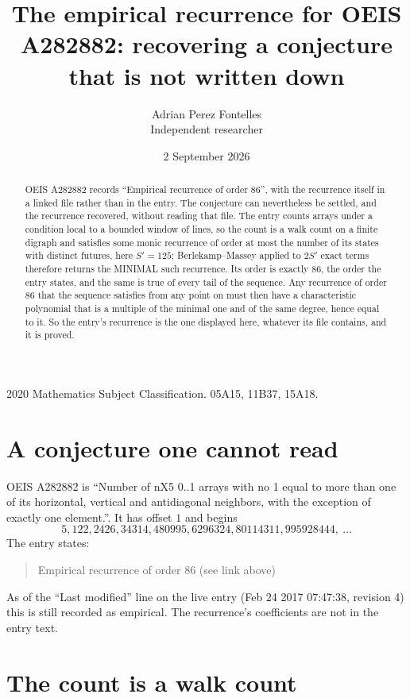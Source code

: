 \documentclass[11pt,a4paper]{article}
\title{The empirical recurrence for OEIS A282882: recovering a conjecture that is not written down}
\author{Adrian Perez Fontelles\\ \small Independent researcher}
\date{2 September 2026}
\theoremstyle{plain}
\theoremstyle{definition}
\begin{document}
\maketitle

\begin{abstract}
OEIS A282882 records ``Empirical recurrence of order $86$'', with the recurrence itself in a
linked file rather than in the entry. The conjecture can nevertheless be settled, and the
recurrence recovered, without reading that file. The entry counts arrays under a condition
local to a bounded window of lines, so the count is a walk count on a finite digraph and
satisfies some monic recurrence of order at most the number of its states with distinct
futures, here $S'=125$; Berlekamp--Massey applied to $2S'$ exact
terms therefore returns the MINIMAL such recurrence. Its order is exactly $86$, the order
the entry states, and the same is true of every tail of the sequence. Any recurrence of order
$86$ that the sequence satisfies from any point on must then have a characteristic
polynomial that is a multiple of the minimal one and of the same degree, hence equal to it. So
the entry's recurrence is the one displayed here, whatever its file contains, and it is
proved.
\end{abstract}

\noindent\small 2020 Mathematics Subject Classification. 05A15, 11B37, 15A18.\normalsize

\section{A conjecture one cannot read}

OEIS A282882 is ``Number of nX5 0..1 arrays with no 1 equal to more than one of its horizontal, vertical and antidiagonal neighbors, with the exception of exactly one element.''. It has offset $1$ and begins
\[
5, 122, 2426, 34314, 480995, 6296324, 80114311, 995928444,\ \dots
\]
The entry states:
\begin{quote}
Empirical recurrence of order 86 (see link above)
\end{quote}
As of the ``Last modified'' line on the live entry (Feb 24 2017 07:47:38, revision 4) this is still
recorded as empirical. The recurrence's coefficients are not in the entry text.

\section{The count is a walk count}
\end{document}
